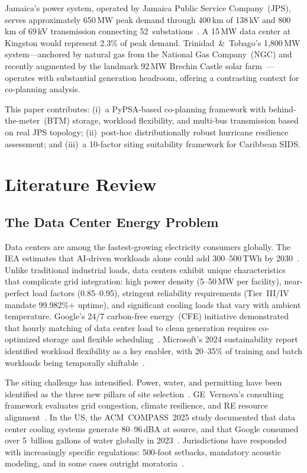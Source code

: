 \documentclass[conference,10pt]{IEEEtran}
\begin{document}
Jamaica's power system, operated by Jamaica Public Service Company~(JPS), serves approximately 650\,MW peak demand through 400\,km of 138\,kV and 800\,km of 69\,kV transmission connecting 52~substations~\cite{jps_grid}. A 15\,MW data center at Kingston would represent 2.3\% of peak demand. Trinidad~\&~Tobago's 1{,}800\,MW system---anchored by natural gas from the National Gas Company~(NGC) and recently augmented by the landmark 92\,MW Brechin Castle solar farm~\cite{brechin2025}---operates with substantial generation headroom, offering a contrasting context for co-planning analysis.

This paper contributes: (i)~a PyPSA-based co-planning framework with behind-the-meter~(BTM) storage, workload flexibility, and multi-bus transmission based on real JPS topology; (ii)~post-hoc distributionally robust hurricane resilience assessment; and (iii)~a 10-factor siting suitability framework for Caribbean SIDS.

\section{Literature Review}

\subsection{The Data Center Energy Problem}

Data centers are among the fastest-growing electricity consumers globally. The IEA estimates that AI-driven workloads alone could add 300--500\,TWh by 2030~\cite{iea2024}. Unlike traditional industrial loads, data centers exhibit unique characteristics that complicate grid integration: high power density (5--50\,MW per facility), near-perfect load factors (0.85--0.95), stringent reliability requirements (Tier~III/IV mandate 99.982\%+ uptime), and significant cooling loads that vary with ambient temperature. Google's 24/7 carbon-free energy~(CFE) initiative demonstrated that hourly matching of data center load to clean generation requires co-optimized storage and flexible scheduling~\cite{google247}. Microsoft's 2024 sustainability report identified workload flexibility as a key enabler, with 20--35\% of training and batch workloads being temporally shiftable~\cite{microsoft2024}.

The siting challenge has intensified. Power, water, and permitting have been identified as the three new pillars of site selection~\cite{dccom2025}. GE~Vernova's consulting framework evaluates grid congestion, climate resilience, and RE resource alignment~\cite{ge_vernova}. In the US, the ACM~COMPASS~2025 study documented that data center cooling systems generate 80--96\,dBA at source, and that Google consumed over 5~billion gallons of water globally in 2023~\cite{compass2025}. Jurisdictions have responded with increasingly specific regulations: 500-foot setbacks, mandatory acoustic modeling, and in some cases outright moratoria~\cite{stafford2025,albemarle2025}.
\end{document}
